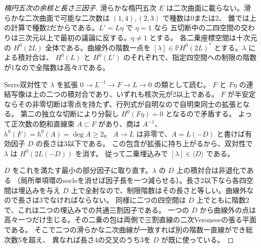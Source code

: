 \begin{proof}[楕円五次の余核と長さ三因子]
滑らかな楕円五次 $E$ は二次曲面に載らない。滑らかな二次曲面で可能な二次数は $(1,4),(2,3)$ で種数は0または2、
錐では上の計算で種数2だからである。$L'=L\eta$ で $\eta=1$ なら
五切断中の二四空間の交わりは三次元以上で最初の議論に反する。$\eta\ne1$ とする。
各二乗座標空間は十次元の $H^0(2L)$ 全体である。曲線外の階数一点を
$[\lambda]\in\mathbb P H^0(2L)^*$ とする。$\lambda$ による積対合は、
$H^0(L)$ と $H^0(L')$ のそれぞれで、指定四空間への制限の階数が1なので全階数は高々3である。

Serre双対性で $\lambda$ を拡張 $0\to L^{-1}\to F\to L\to0$ の類として読む。
$F$ と $F\eta$ の連結写像は上の二つの積対合であり、いずれも核次元が2以上である。
$F$ が半安定ならその非零切断は零点を持たず、行列式が自明なので自明束同士の拡張となる。
第二の独立な切断により分裂し $H^0(F\eta)=0$ となるので矛盾する。
よって正次数の飽和直線束 $A\subset F$ があり、商は $A^{-1}$、$h^0(F)=h^0(A)=\deg A\ge2$。
$A\to L$ は非零で、$A=L(-D)$ と書けば有効因子 $D$ の長さは3以下である。
この包含が拡張に持ち上がるから、双対性で $\lambda$ は $H^0(2L(-D))$ を消す。
従って二乗埋込みで $[\lambda]\in\langle D\rangle$ である。

$D$ をこれを満たす最小の部分因子に取り直す。$\lambda$ の $D$ 上の積対合は非退化である
（局所単項環のsocleを消せば因子長を一つ減らせる）。長さ2以下なら各四空間は埋込みを与え
$D$ 上で全射なので、制限階数はその長さと等しい。曲線外なので長さは3でなければならない。
同様に二つの四空間は $D$ 上でともに階数2で、これは二つの埋込みでの共通三割因子である。
一つの $D$ から曲線外の点は高々一つだけ生じる。その二乗の包は両側で三割直線の二次Veroneseの張る平面である。
そこで二つの滑らかな二次曲線が一致すれば別の階数一直線ができ総次数5を超え、
異なれば長さ4の交叉のうち3を $D$ が既に使っている。
\end{proof}
